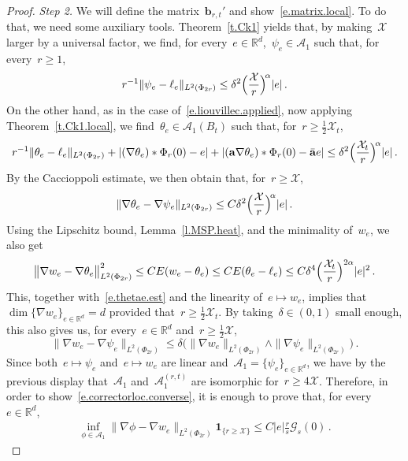 \documentclass[11pt,twoside]{article} %
\numberwithin{equation}{section}
\theoremstyle{definition}
\newcommand*{\R}{\ensuremath{\mathbb{R}}}
\renewcommand{\b}{\ensuremath{\mathbf{b}}}
\renewcommand{\a}{\mathbf{a}}
\newcommand{\ahom}{\bar{\a}}
\newcommand{\X}{\mathcal{X}}
\newcommand{\indc}{\boldsymbol{1}}
\newcommand{\A}{\mathcal{A}}
\begin{document}
\begin{proof}
\smallskip

\emph{Step 2.} We will define the matrix~$\b_{r,t}'$ and show~\eqref{e.matrix.local}. To do that, we need some auxiliary tools. Theorem~\ref{t.Ck1} yields that, by making~$\X$ larger by a universal factor, 
we find, for every~$e \in \R^d$,~$\psi_e \in \A_1$ such that, for every~$r\geq 1$, 
\begin{align*}  
r^{-1} \| \psi_e - \ell_e \|_{L^2(\Phi_{2r})} \leq \delta^2 \Bigl( \frac{\X}{r} \Bigr)^{\! \alpha} |e| \,.
\end{align*}
On the other hand, as in the case of~\eqref{e.liouvillec.applied}, now applying Theorem~\ref{t.Ck1.local}, we find~$\theta_e \in \A_1(B_t)$ such that, for~$r\geq \frac12 \X_t$, 
\begin{align} \label{e.thetae.est}
r^{-1} \| \theta_e - \ell_e \|_{L^2(\Phi_{2r})} + |(\nabla \theta_e)\ast \Phi_r(0) - e| + |(\a \nabla \theta_e)\ast \Phi_r(0) - \ahom e|  \leq \delta^2 \Bigl( \frac{\X_t}{r} \Bigr)^{\! \alpha} |e| \,.
\end{align}
By the Caccioppoli estimate, we then obtain that, for~$r \geq \X$, 
\begin{align*}  
\| \nabla \theta_e - \nabla \psi_e \|_{L^2(\Phi_{2r})} \leq C  \delta^2 \Bigl( \frac{\X}{r} \Bigr)^{\! \alpha} |e| \,. 
\end{align*}
Using the Lipschitz bound, Lemma~\ref{l.MSP.heat}, and the minimality of~$w_e$, we also get
\begin{align}  \label{e.we.vs.thetae}
\big\| \nabla w_e - \nabla \theta_e \big\|_{L^2(\Phi_{2r})}^2  \leq C E(w_e - \theta_e ) \leq 
C E(\theta_e - \ell_e)  \leq C \delta^4  \Bigl( \frac{\X_t}{r} \Bigr)^{2\alpha} |e|^2  \,.
\end{align}
This, together with~\eqref{e.thetae.est} and the linearity of~$e \mapsto w_e$, implies that~$\dim\{\nabla w_e \}_{e \in \R^d} = d$ provided that~$r \geq \frac12 \X_t$. 
By taking~$\delta \in(0,1)$ small enough, this also gives us, for every~$e \in \R^d$ and~$r \geq \frac12 \X$,
\begin{equation*}  
\| \nabla w_e - \nabla \psi_e \|_{L^2(\Phi_{2r})} 
\leq 
\delta \bigl(  \| \nabla w_e \|_{L^2(\Phi_{2r})} \wedge \| \nabla \psi_e \|_{L^2(\Phi_{2r})} \bigr) \,.
\end{equation*}
Since both~$e \mapsto \psi_e$ and~$e \mapsto w_e$ are linear and~$\A_1 = \{ \psi_e \}_{e \in \R^d}$, we have by the previous display that~$\A_1$ and~$\A_1^{(r,t)}$ are isomorphic for~$r\geq 4 \X$. Therefore, in order to show~\eqref{e.correctorloc.converse}, it is enough to prove that, for every~$e \in \R^d$, 
\begin{align*}  
\inf_{\phi \in \A_1 }
\big\| \nabla \phi - \nabla w_e \big\|_{L^2(\Phi_{2r})}
\indc_{\{ r \geq \X \}} %
\leq 
C |e| \frac{r}{s} \mathcal{G}_{s}(0) 
\,.
\end{align*}


\end{proof}
\end{document}
